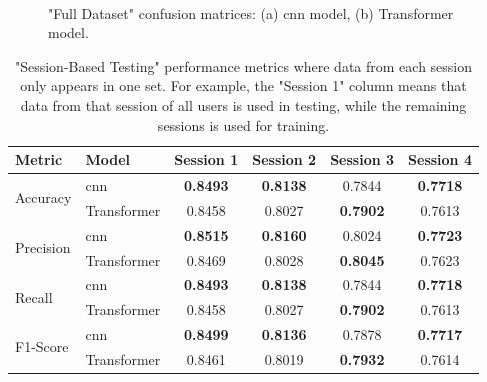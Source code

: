 \begin{figure}[ht]
    \centering
    \begin{subfigure}[b]{0.32\columnwidth}
        {\fontsize{8}{10}\selectfont}
        \caption{\centering}
    \end{subfigure} \
    \begin{subfigure}[b]{0.32\columnwidth}
        {\fontsize{8}{10}\selectfont}
        \caption{\centering}
    \end{subfigure}
    \caption[Multi-User Confusion matrices]{"Full Dataset" confusion matrices: (a) \acs{cnn} model, (b) Transformer model.}
    \label{fig:multi_user_conf_matrices}
\end{figure}

\begin{table}[ht]
    \centering
    \caption{"Session-Based Testing" performance metrics where data from each session only appears in one set. For example, the "Session 1" column means that data from that session of all users is used in testing, while the remaining sessions is used for training.}
    \label{table:results_first_caseB}
    \begin{tabular}{l|lcccc}
        \toprule
        Metric & Model & Session 1 & Session 2 & Session 3 & Session 4 \\
        \midrule
        \multirow{2}{*}{Accuracy} & \acs{cnn} & \textbf{0.8493} & \textbf{0.8138} & 0.7844 & \textbf{0.7718} \\
        & Transformer & 0.8458 & 0.8027 & \textbf{0.7902} & 0.7613 \\
        \midrule
        \multirow{2}{*}{Precision} & \acs{cnn} & \textbf{0.8515} & \textbf{0.8160} & 0.8024 & \textbf{0.7723} \\
        & Transformer & 0.8469 & 0.8028 & \textbf{0.8045} & 0.7623 \\
        \midrule
        \multirow{2}{*}{Recall} & \acs{cnn} & \textbf{0.8493} & \textbf{0.8138} & 0.7844 & \textbf{0.7718} \\
        & Transformer & 0.8458 & 0.8027 & \textbf{0.7902} & 0.7613 \\
        \midrule
        \multirow{2}{*}{F1-Score} & \acs{cnn} & \textbf{0.8499} & \textbf{0.8136} & 0.7878 & \textbf{0.7717} \\
        & Transformer & 0.8461 & 0.8019 & \textbf{0.7932} & 0.7614 \\
        \bottomrule
    \end{tabular}
\end{table}

